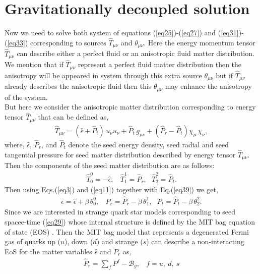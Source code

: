 \documentclass[]{aastex631}
\begin{document}
\section{Gravitationally decoupled solution} \label{sec3}
Now we need to solve both system of equations (\ref{eq25})-(\ref{eq27}) and (\ref{eq31})-(\ref{eq33}) corresponding to sources $\hat{T}_{\mu\nu}$ and $\theta_{\mu\nu}$. Here the energy momentum tensor $\hat{T}_{\mu\nu}$ can describe either a perfect fluid or an anisotropic fluid matter distribution. We  mention that if $\hat{T}_{\mu\nu}$ represent a perfect fluid matter distribution then the anisotropy will be appeared in system through this extra source $\theta_{\mu\nu}$ but if $\hat{T}_{\mu\nu}$ already describes the anisotropic fluid then this $\theta_{\mu\nu}$ may enhance the anisotropy of the system. \\          
But here we consider the anisotropic matter distribution corresponding to energy tensor $\hat{T}_{\mu\nu}$ that can be defined as,
\begin{eqnarray}
\hat{T}_{\mu\nu} = (\hat{\epsilon} + \hat{P}_{t})\,u_{\nu} u_{\nu}+ \hat{P}_{t}\, g_{\mu\nu}+(\hat{P}_r-\hat{P}_{t})\chi_{\mu}\,\chi_{\nu}, \label{38}
\end{eqnarray}
where, $\hat{\epsilon}$, $\hat{P}_{r}$, and $\hat{P}_{t}$ denote the seed energy density, seed radial and seed tangential pressure for seed matter distribution described by energy tensor $\hat{T}_{\mu\nu}$. Then the components of the seed matter distribution are as follows:
\begin{eqnarray}
\hat{T}^0_0=-\hat{\epsilon},~~~~\hat{T}^1_1=\hat{P}_r,~~~\hat{T}^2_2=\hat{P}_t. \label{eq39}
\end{eqnarray}
Then using Eqs.(\ref{eq3}) and (\ref{eq11}) together with Eq.(\ref{eq39}) we get,
\begin{eqnarray}
\epsilon=\hat{\epsilon}+\beta\,\theta^0_0,~~~~P_r=\hat{P}_r-\beta\,\theta^1_1,~~~P_t=\hat{P}_t-\beta\,\theta^2_2. \label{eq40}
\end{eqnarray}
Since we are interested in strange quark star models corresponding to seed spacee-time (\ref{eq29}) whose internal structure is defined by the MIT bag equation of state (EOS) \citep{Chodos:1974}. Then the MIT bag model that represents a degenerated Fermi gas of quarks up ($u$), down ($d$) and strange ($s$) \citep{Chodos:1974,Farhi:1984} can  describe a  non-interacting EoS for the matter variables $\hat{\epsilon}$ and $P_r$ as,
\begin{eqnarray} \label{eq41}
\hat{P}_r=\sum_{f} P^{f}-\mathcal{B}_g,~~~~f=u,~d,~s
\end{eqnarray}
\end{document}
